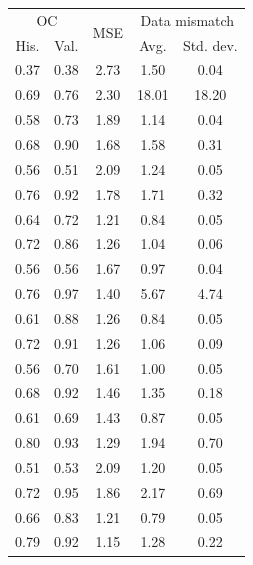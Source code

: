 \begin{tabular}{ccccc}
\toprule
\multicolumn{2}{c}{OC} & 
\multirow{2}{*}{
    MSE
} & 
\multicolumn{2}{c}{Data mismatch} 
\\
His. & Val. &  & Avg. & Std. dev.
\\
\midrule
0.37 & 0.38 & 2.73 & 1.50 & 0.04 \\
0.69 & 0.76 & 2.30 & 18.01 & 18.20 \\
\midrule
0.58 & 0.73 & 1.89 & 1.14 & 0.04 \\
0.68 & 0.90 & 1.68 & 1.58 & 0.31 \\
\midrule
0.56 & 0.51 & 2.09 & 1.24 & 0.05 \\
0.76 & 0.92 & 1.78 & 1.71 & 0.32 \\
\midrule
0.64 & 0.72 & 1.21 & 0.84 & 0.05 \\
0.72 & 0.86 & 1.26 & 1.04 & 0.06 \\
\midrule
0.56 & 0.56 & 1.67 & 0.97 & 0.04 \\
0.76 & 0.97 & 1.40 & 5.67 & 4.74 \\
\midrule
0.61 & 0.88 & 1.26 & 0.84 & 0.05 \\
0.72 & 0.91 & 1.26 & 1.06 & 0.09 \\
\midrule
0.56 & 0.70 & 1.61 & 1.00 & 0.05 \\
0.68 & 0.92 & 1.46 & 1.35 & 0.18 \\
\midrule
0.61 & 0.69 & 1.43 & 0.87 & 0.05 \\
0.80 & 0.93 & 1.29 & 1.94 & 0.70 \\
\midrule
0.51 & 0.53 & 2.09 & 1.20 & 0.05 \\
0.72 & 0.95 & 1.86 & 2.17 & 0.69 \\
\midrule
0.66 & 0.83 & 1.21 & 0.79 & 0.05 \\
0.79 & 0.92 & 1.15 & 1.28 & 0.22 \\
\bottomrule
\end{tabular}
